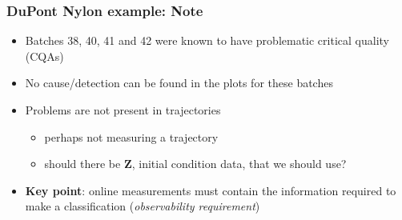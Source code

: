 \begin{frame}\frametitle{DuPont Nylon example: Note}

	\begin{itemize}
		\item	Batches 38, 40, 41 and 42 were known to have problematic critical quality (CQAs)
		
		\item	No cause/detection can be found in the plots for these batches
		
		\item	Problems are not present in trajectories
				
				\begin{itemize}
					\item	perhaps not measuring a trajectory
					
					\item	should there be \( \mathbf{Z} \), initial condition data, that we should use?
				\end{itemize}
		
		\item	\textbf{Key point}: online measurements must contain the information required to make a classification (\emph{observability requirement})			
		
	\end{itemize}
	
	
\end{frame}

